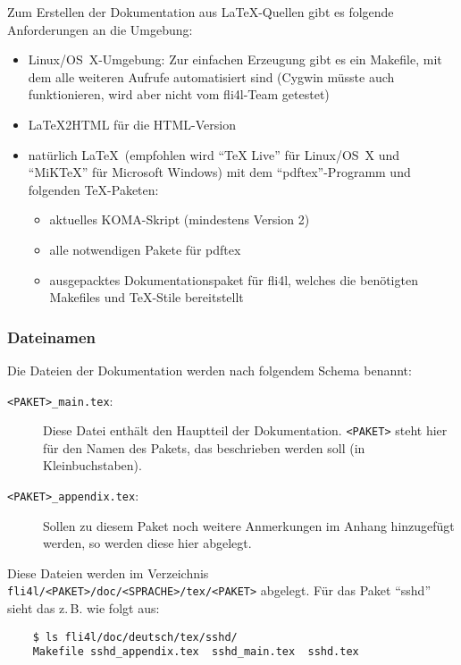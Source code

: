   Zum Erstellen der Dokumentation aus \LaTeX-Quellen gibt es folgende
  Anforderungen an die Umgebung:

  \begin{itemize}
  \item Linux/OS~X-Umgebung: Zur einfachen Erzeugung gibt es ein Makefile,
    mit dem alle weiteren Aufrufe automatisiert sind (Cygwin müsste auch
    funktionieren, wird aber nicht vom fli4l-Team getestet)
  \item LaTeX2HTML für die HTML-Version
  \item natürlich \LaTeX\ (empfohlen wird "`TeX Live"' für Linux/OS~X und
  "`MiKTeX"' für Microsoft Windows) mit dem "`pdftex"'-Programm und folgenden
    \TeX-Paketen:
    \begin{itemize}
    \item aktuelles KOMA-Skript (mindestens Version 2)
    \item alle notwendigen Pakete für pdftex
    \item ausgepacktes Dokumentationspaket für fli4l, welches die
      benötigten Makefiles und \TeX-Stile bereitstellt
  \end{itemize}
  \end{itemize}


\subsubsection{Dateinamen}

Die Dateien der Dokumentation werden nach folgendem Schema benannt:

\begin{description}
\item [\texttt{<PAKET>\_main.tex}:] Diese Datei enthält den Hauptteil der
  Dokumentation. \texttt{<PAKET>} steht hier für den Namen des
  Pakets, das beschrieben werden soll (in Kleinbuchstaben).
\item[\texttt{<PAKET>\_appendix.tex}:] Sollen zu diesem Paket noch
  weitere Anmerkungen im Anhang hinzugefügt werden, so werden
  diese hier abgelegt.
\end{description}

Diese Dateien werden im Verzeichnis
\texttt{fli4l/<PAKET>/doc/<SPRACHE>/tex/<PAKET>}
abgelegt.  Für das Paket "`sshd"' sieht das z.\,B. wie folgt aus:

\begin{verbatim}
    $ ls fli4l/doc/deutsch/tex/sshd/
    Makefile sshd_appendix.tex  sshd_main.tex  sshd.tex
\end{verbatim}

